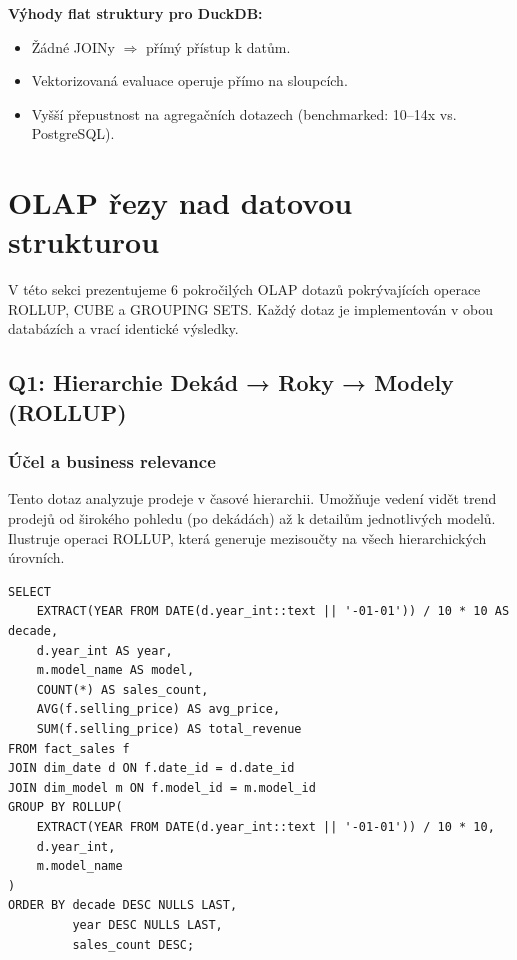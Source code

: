 \documentclass[12pt,a4paper]{article}
\begin{document}
\textbf{Výhody flat struktury pro DuckDB:}
\begin{itemize}
    \item Žádné JOINy $\Rightarrow$ přímý přístup k datům.
    \item Vektorizovaná evaluace operuje přímo na sloupcích.
    \item Vyšší přepustnost na agregačních dotazech (benchmarked: 10–14x vs. PostgreSQL).
\end{itemize}

\newpage

\section{OLAP řezy nad datovou strukturou}

V této sekci prezentujeme 6 pokročilých OLAP dotazů pokrývajících operace ROLLUP, CUBE a GROUPING SETS.
Každý dotaz je implementován v obou databázích a vrací identické výsledky.

\subsection{Q1: Hierarchie Dekád → Roky → Modely (ROLLUP)}

\subsubsection{Účel a business relevance}

Tento dotaz analyzuje prodeje v časové hierarchii. Umožňuje vedení vidět trend prodejů
od širokého pohledu (po dekádách) až k detailům jednotlivých modelů. Ilustruje operaci ROLLUP,
která generuje mezisoučty na všech hierarchických úrovních.

\begin{lstlisting}[caption=Q1: ROLLUP – PostgreSQL + DuckDB]
SELECT 
    EXTRACT(YEAR FROM DATE(d.year_int::text || '-01-01')) / 10 * 10 AS decade,
    d.year_int AS year,
    m.model_name AS model,
    COUNT(*) AS sales_count,
    AVG(f.selling_price) AS avg_price,
    SUM(f.selling_price) AS total_revenue
FROM fact_sales f
JOIN dim_date d ON f.date_id = d.date_id
JOIN dim_model m ON f.model_id = m.model_id
GROUP BY ROLLUP(
    EXTRACT(YEAR FROM DATE(d.year_int::text || '-01-01')) / 10 * 10,
    d.year_int,
    m.model_name
)
ORDER BY decade DESC NULLS LAST,
         year DESC NULLS LAST,
         sales_count DESC;
\end{lstlisting}
\end{document}
